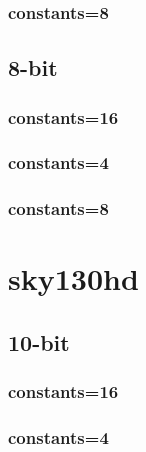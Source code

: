 \documentclass{article}
\begin{document}
\subsubsection*{constants=8}
\begin{figure}[H]
\centering
\resizebox{0.95\linewidth}{!}{}
\end{figure}
\subsection*{8-bit}
\subsubsection*{constants=16}
\begin{figure}[H]
\centering
\resizebox{0.95\linewidth}{!}{}
\end{figure}
\subsubsection*{constants=4}
\begin{figure}[H]
\centering
\resizebox{0.95\linewidth}{!}{}
\end{figure}
\subsubsection*{constants=8}
\begin{figure}[H]
\centering
\resizebox{0.95\linewidth}{!}{}
\end{figure}
\section*{sky130hd}
\subsection*{10-bit}
\subsubsection*{constants=16}
\begin{figure}[H]
\centering
\resizebox{0.95\linewidth}{!}{}
\end{figure}
\subsubsection*{constants=4}
\begin{figure}[H]
\centering
\resizebox{0.95\linewidth}{!}{}
\end{figure}
\end{document}
